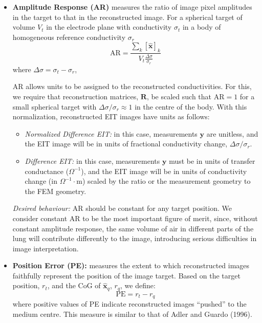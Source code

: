 \documentclass[12pt]{iopart}
\newcommand{\xH}{\mbox{$\mathbf{\hat x}$}}
\newcommand{\yB}{\mbox{$\mathbf{y}$}}
\newcommand{\RB}{\mbox{$\mathbf{R}$}}
\begin{document}
\begin{itemize}

\item
{\bf Amplitude Response (AR)}
measures the ratio of image pixel amplitudes in the
target to that in the reconstructed image.
For a spherical target of volume $V_t$ in the electrode
plane with
conductivity $\sigma_t$ in a body of homogeneous reference
conductivity $\sigma_r$
\begin{equation}
\mathrm{AR} =  \frac{
    \sum_k [\xH]_k
  }{
    V_t \frac{\Delta\sigma}{\sigma_r}
  }
\end{equation}
where $\Delta\sigma = \sigma_t - \sigma_r$,

\hspace{5mm}
AR allows units to be assigned to the 
reconstructed conductivities. For this, we 
require that reconstruction matrices, $\RB$, be
scaled such that AR$=1$ for 
a small spherical target with
 $\Delta\sigma/\sigma_r \approx 1$
in the centre of the body.
With this normalization, reconstructed EIT images have
units as follows:
   \begin{itemize}
   \item {\em Normalized Difference EIT:}
in this case, measurements $\yB$ are unitless,
and the EIT image will be in units of fractional conductivity
change, $\Delta\sigma/\sigma_r$.
   \item {\em Difference EIT:}
in this case, measurements $\yB$ must be in units of
transfer conductance ($\Omega^{-1}$), and the EIT image
will be in units of conductivity change (in $\Omega^{-1}\cdot$m)
scaled by the ratio or the measurement geometry to
the FEM geometry.
   \end{itemize}


\hspace{5mm}
{\em Desired behaviour:}
AR should be constant for any target position. We consider
constant
AR to be the most important figure of merit, since, without
constant amplitude response, the same volume of air in different parts
of the lung will contribute differently to the image, introducing
serious difficulties in image interpretation.

\item
{\bf Position Error (PE):}
measures the extent to which reconstructed images faithfully
represent the position of the image target. Based on the
target position, $r_t$, and the CoG of $\xH_q$, $r_q$, we define:
\begin{equation}
\mathrm{PE} = r_t - r_q
\end{equation}
where positive values of PE indicate reconstructed images
``pushed'' to the medium centre. This measure is similar
to that of Adler and Guardo (1996).


\end{itemize}
\end{document}
